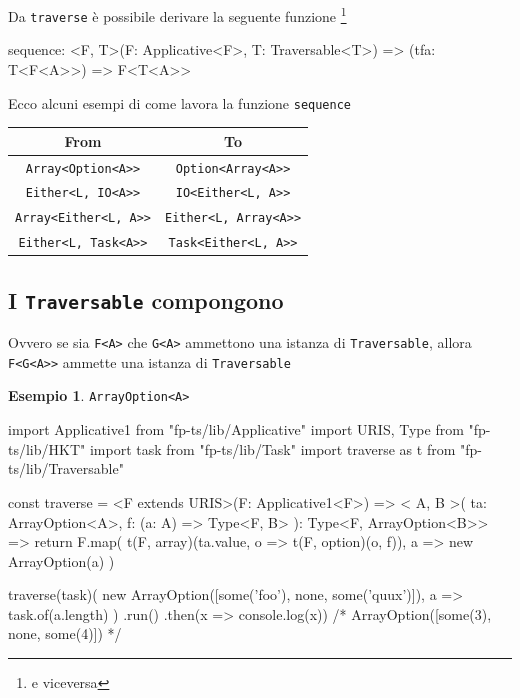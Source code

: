 \documentclass[12pt]{article}
\theoremstyle{definition}
\newtheorem{example}{Esempio}[section]
\newenvironment{code}
  {\vspace{0.5cm} \VerbatimEnvironment\begin{typescriptcode}}
  {\end{typescriptcode} \vspace{0.2cm}}
\begin{document}
Da \texttt{traverse} è possibile derivare la seguente funzione \footnote{e viceversa}

\begin{code}
sequence: <F, T>(F: Applicative<F>, T: Traversable<T>) =>
  (tfa: T<F<A>>) => F<T<A>>
\end{code}

Ecco alcuni esempi di come lavora la funzione \texttt{sequence}

\begin{center}
\bgroup
\def\arraystretch{1.5}
\begin{tabular}{ |c|c| }
\hline
From & To \\
\hline
\texttt{Array<Option<A>>} & \texttt{Option<Array<A>>} \\
\hline
\texttt{Either<L, IO<A>>} & \texttt{IO<Either<L, A>>} \\
\hline
\texttt{Array<Either<L, A>>} & \texttt{Either<L, Array<A>>} \\
\hline
\texttt{Either<L, Task<A>>} & \texttt{Task<Either<L, A>>} \\
\hline
\end{tabular}
\egroup
\end{center}

\subsection{I \texttt{Traversable} compongono}

Ovvero se sia \texttt{F<A>} che \texttt{G<A>} ammettono una istanza di \texttt{Traversable}, allora \texttt{F<G<A>>} ammette una istanza di \texttt{Traversable}

\begin{example}
\texttt{ArrayOption<A>}

\begin{code}
import { Applicative1 } from "fp-ts/lib/Applicative"
import { URIS, Type } from "fp-ts/lib/HKT"
import { task } from "fp-ts/lib/Task"
import { traverse as t } from "fp-ts/lib/Traversable"

const traverse = <F extends URIS>(F: Applicative1<F>) => <
  A,
  B
>(
  ta: ArrayOption<A>,
  f: (a: A) => Type<F, B>
): Type<F, ArrayOption<B>> => {
  return F.map(
    t(F, array)(ta.value, o => t(F, option)(o, f)),
    a => new ArrayOption(a)
  )
}

traverse(task)(
  new ArrayOption([some('foo'), none, some('quux')]),
  a => task.of(a.length)
)
  .run()
  .then(x => console.log(x))
/*
ArrayOption([some(3), none, some(4)])
*/
\end{code}
\end{example}
\end{document}
